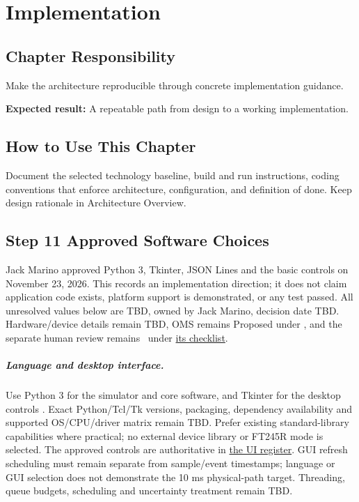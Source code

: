 \chapter{Implementation}
\section{Chapter Responsibility}
\label{Section:ImplementationResponsibility}
Make the architecture reproducible through concrete implementation guidance.

\noindent\textbf{Expected result:} A repeatable path from design to a working implementation.

\section{How to Use This Chapter}
Document the selected technology baseline, build and run instructions, coding conventions that enforce architecture, configuration, and definition of done. Keep design rationale in Architecture Overview.
\section{Step 11 Approved Software Choices}
\label{Section:ApprovedSoftwareChoices}
Jack Marino approved Python 3, Tkinter, JSON Lines and the basic controls on
November 23, 2026. This records an implementation direction; it does not claim
application code exists, platform support is demonstrated, or any test passed.
All unresolved values below are TBD, owned by Jack Marino, decision date TBD.
Hardware/device details remain TBD, OMS remains Proposed under
, and the separate human review remains
\StatusPending\ under \hyperref[Section:HumanReviewChecklist]{its checklist}.

\paragraph{Language and desktop interface.}
Use Python 3 for the simulator and core software, and Tkinter for the desktop
controls \cite{PythonGeneralFAQ,TkinterDocumentation}. Exact Python/Tcl/Tk
versions, packaging, dependency availability and supported OS/CPU/driver
matrix remain TBD. Prefer existing standard-library capabilities where
practical; no external device library or FT245R mode is selected. The approved
controls are authoritative in \hyperref[Table:ApprovedControls]{the UI register}.
GUI refresh scheduling must remain separate from sample/event timestamps;
language or GUI selection does not demonstrate the 10 ms physical-path target.
Threading, queue budgets, scheduling and uncertainty treatment remain TBD.

